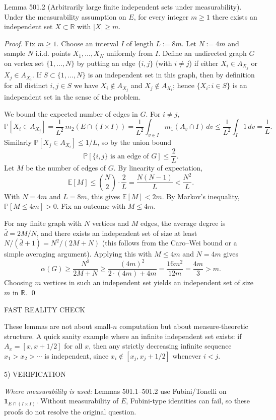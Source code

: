 Lemma 501.2 (Arbitrarily large finite independent sets under measurability).
Under the measurability assumption on $E$, for every integer $m\ge 1$ there exists an independent set $X\subset\mathbb R$ with $\lvert X\rvert\ge m$.

\emph{Proof.}
Fix $m\ge 1$. Choose an interval $I$ of length $L:=8m$.
Let $N:=4m$ and sample $N$ i.i.d. points $X_1,\dots,X_N$ uniformly from $I$.
Define an undirected graph $G$ on vertex set $\{1,\dots,N\}$ by putting an edge $\{i,j\}$ (with $i\ne j$) if either $X_i\in A_{X_j}$ or $X_j\in A_{X_i}$.
If $S\subset\{1,\dots,N\}$ is an independent set in this graph, then by definition for all distinct $i,j\in S$ we have $X_i\notin A_{X_j}$ and $X_j\notin A_{X_i}$; hence $\{X_i:i\in S\}$ is an independent set in the sense of the problem.

We bound the expected number of edges in $G$.
For $i\ne j$,
\[
\mathbb P[X_i\in A_{X_j}]
=\frac{1}{L^2}\,m_2(E\cap (I\times I))
=\frac{1}{L^2}\int_{v\in I} m_1(A_v\cap I)\,dv
\le \frac{1}{L^2}\int_I 1\,dv
=\frac{1}{L}.
\]
Similarly $\mathbb P[X_j\in A_{X_i}]\le 1/L$, so by the union bound
\[\mathbb P[\{i,j\}\text{ is an edge of }G]\le \frac{2}{L}.
\]
Let $M$ be the number of edges of $G$. By linearity of expectation,
\[
\mathbb E[M]
\le \binom{N}{2}\cdot \frac{2}{L}
=\frac{N(N-1)}{L}
<\frac{N^2}{L}.
\]
With $N=4m$ and $L=8m$, this gives $\mathbb E[M]<2m$.
By Markov's inequality, $\mathbb P[M\le 4m]>0$.
Fix an outcome with $M\le 4m$.

For any finite graph with $N$ vertices and $M$ edges, the average degree is $\bar d=2M/N$, and there exists an independent set of size at least $N/(\bar d+1)=N^2/(2M+N)$ (this follows from the Caro--Wei bound or a simple averaging argument).
Applying this with $M\le 4m$ and $N=4m$ gives
\[
\alpha(G)\ge \frac{N^2}{2M+N}\ge \frac{(4m)^2}{2\cdot (4m) + 4m}=\frac{16m^2}{12m}=\frac{4m}{3}>m.
\]
Choosing $m$ vertices in such an independent set yields an independent set of size $m$ in $\mathbb R$.
\qed

FAST REALITY CHECK

These lemmas are not about small-$n$ computation but about measure-theoretic structure. A quick sanity example where an infinite independent set exists: if $A_x=[x,x+1/2]$ for all $x$, then any strictly decreasing infinite sequence $x_1>x_2>\cdots$ is independent, since $x_i\notin [x_j,x_j+1/2]$ whenever $i<j$.

5) VERIFICATION

\emph{Where measurability is used:} Lemmas 501.1--501.2 use Fubini/Tonelli on $\mathbf 1_{E\cap (I\times I)}$. Without measurability of $E$, Fubini-type identities can fail, so these proofs do not resolve the original question.

